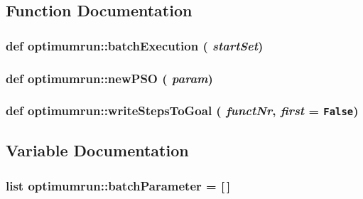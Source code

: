 \subsection{Function Documentation}
\hypertarget{namespaceoptimumrun_b05973804d7fd8fa20d178a58b789f35}{
\subsubsection{\setlength{\rightskip}{0pt plus 5cm}def optimumrun::batchExecution ( {\em startSet})}}
\label{namespaceoptimumrun_b05973804d7fd8fa20d178a58b789f35}


\hypertarget{namespaceoptimumrun_1fe6f6f089db055ffca07f29ba6b9818}{
\subsubsection{\setlength{\rightskip}{0pt plus 5cm}def optimumrun::newPSO ( {\em param})}}
\label{namespaceoptimumrun_1fe6f6f089db055ffca07f29ba6b9818}


\hypertarget{namespaceoptimumrun_972437e5a6e5d622224eab3804ef8215}{
\subsubsection{\setlength{\rightskip}{0pt plus 5cm}def optimumrun::writeStepsToGoal ( {\em functNr}, \/   {\em first} = {\tt False})}}
\label{namespaceoptimumrun_972437e5a6e5d622224eab3804ef8215}




\subsection{Variable Documentation}
\hypertarget{namespaceoptimumrun_5826b6dcd71d148fba7c54593b6f8133}{
\subsubsection{\setlength{\rightskip}{0pt plus 5cm}list {\bf optimumrun::batchParameter} = \mbox{[}$\,$\mbox{]}}}
\label{namespaceoptimumrun_5826b6dcd71d148fba7c54593b6f8133}


